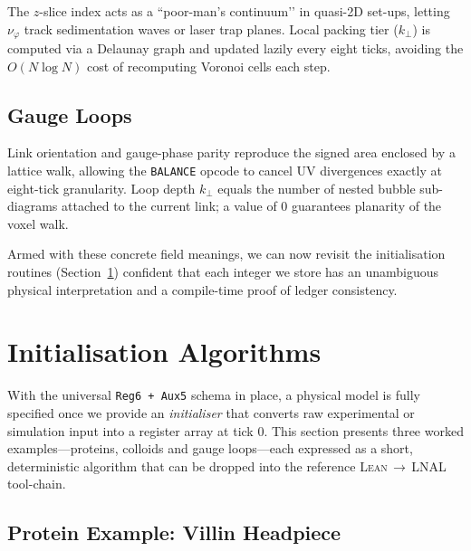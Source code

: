 \documentclass[11pt,a4paper]{article}
\begin{document}
The $z$-slice index acts as a ``poor-man’s continuum’’ in quasi-2D
set-ups, letting $\nu_{\varphi}$ track sedimentation waves or laser
trap planes.  Local packing tier ($k_{\!\perp}$) is computed via a
Delaunay graph and updated lazily every eight ticks, avoiding the
$O(N\log N)$ cost of recomputing Voronoi cells each step.

\subsection{Gauge Loops}
\label{subsec:table-gauge}

Link orientation and gauge-phase parity reproduce the signed area
enclosed by a lattice walk, allowing the \texttt{BALANCE} opcode to
cancel UV divergences exactly at eight-tick granularity.
Loop depth $k_{\!\perp}$ equals the number of nested bubble
sub-diagrams attached to the current link; a value of $0$ guarantees
planarity of the voxel walk.

\bigskip
Armed with these concrete field meanings, we can now revisit the
initialisation routines (Section~\ref{sec:init}) confident that each
integer we store has an unambiguous physical interpretation and a
compile-time proof of ledger consistency.





\section{Initialisation Algorithms}
\label{sec:init}

\noindent
With the universal \texttt{Reg6\,+\,Aux5} schema in place, a physical model
is fully specified once we provide an \emph{initialiser} that converts
raw experimental or simulation input into a register array at
tick $0$.  This section presents three worked examples—proteins,
colloids and gauge loops—each expressed as a short, deterministic
algorithm that can be dropped into the reference
\textsc{Lean}\,$\to$\,LNAL tool-chain.

\subsection{Protein Example: Villin Headpiece}
\label{subsec:init-protein}
\end{document}
